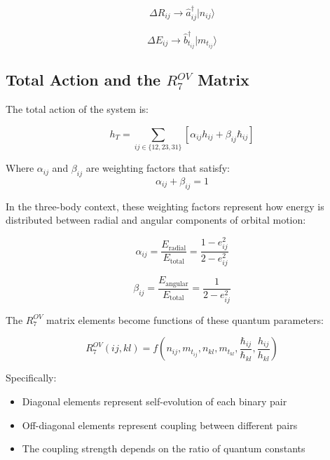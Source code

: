 \documentclass{article}
\begin{document}
\begin{equation}
\Delta R_{ij} \rightarrow \hat{a}_{ij}^{\dagger}|n_{ij}\rangle
\end{equation}

\begin{equation}
\Delta E_{ij} \rightarrow \hat{b}_{t_{ij}}^{\dagger}|m_{t_{ij}}\rangle
\end{equation}

\subsection{Total Action and the $R^{OV}_7$ Matrix}

The total action of the system is:

\begin{equation}
h_T = \sum_{ij \in \{12,23,31\}} \left[ \alpha_{ij}h_{ij} + \beta_{ij}\hbar_{ij} \right]
\end{equation}

Where $\alpha_{ij}$ and $\beta_{ij}$ are weighting factors that satisfy:
\begin{equation}
\alpha_{ij} + \beta_{ij} = 1
\end{equation}

In the three-body context, these weighting factors represent how energy is distributed between radial and angular components of orbital motion:

\begin{equation}
\alpha_{ij} = \frac{E_{\text{radial}}}{E_{\text{total}}} = \frac{1-e_{ij}^2}{2-e_{ij}^2}
\end{equation}

\begin{equation}
\beta_{ij} = \frac{E_{\text{angular}}}{E_{\text{total}}} = \frac{1}{2-e_{ij}^2}
\end{equation}

The $R^{OV}_7$ matrix elements become functions of these quantum parameters:

\begin{equation}
R^{OV}_7(ij,kl) = f\left(n_{ij}, m_{t_{ij}}, n_{kl}, m_{t_{kl}}, \frac{\hbar_{ij}}{\hbar_{kl}}, \frac{h_{ij}}{h_{kl}}\right)
\end{equation}

Specifically:
\begin{itemize}
\item Diagonal elements represent self-evolution of each binary pair
\item Off-diagonal elements represent coupling between different pairs
\item The coupling strength depends on the ratio of quantum constants
\end{itemize}
\end{document}
